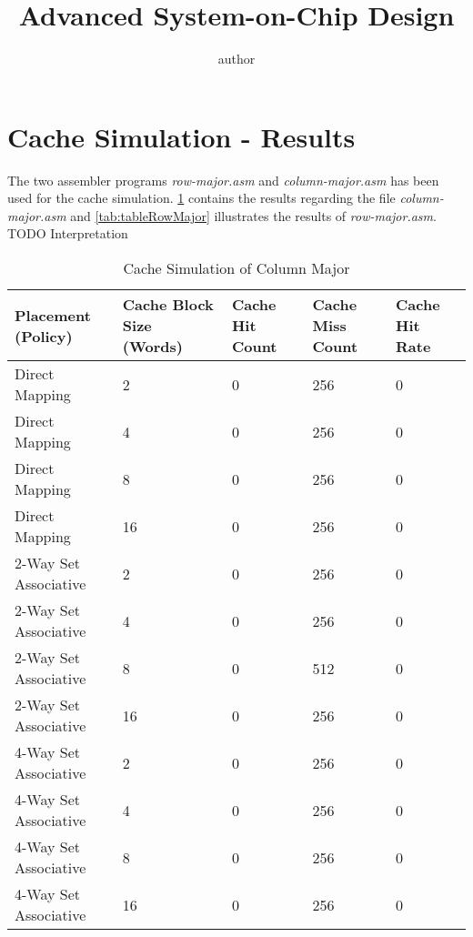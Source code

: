 \documentclass[11pt,a4paper]{article}
\title{Advanced System-on-Chip Design}
\author{author}
\begin{document}


\tableofcontents
\newpage

\section{Cache Simulation - Results}
The two assembler programs \textit{row-major.asm} and \textit{column-major.asm} has been used for the cache simulation. \ref{tab:tableColumnMajor} contains the results regarding the file \textit{column-major.asm} and  \ref{tab:tableRowMajor} illustrates the results of \textit{row-major.asm}.\\
TODO Interpretation



\begin{table}
\centering
\caption{Cache Simulation of Column Major}
\label{tab:tableColumnMajor}
\begin{tabular}{lllll}
\hline %
Placement (Policy) & Cache Block Size (Words) & Cache Hit Count & Cache Miss Count & Cache Hit Rate \\
\hline %
Direct Mapping & 2 & 0 & 256 & 0  \\
Direct Mapping & 4 & 0 & 256 & 0  \\
Direct Mapping & 8 & 0 & 256 & 0  \\
Direct Mapping & 16 & 0 & 256 & 0  \\
2-Way Set Associative & 2 & 0 & 256 & 0 \\
2-Way Set Associative & 4 & 0 & 256 & 0 \\
2-Way Set Associative & 8 & 0 & 512 & 0 \\
2-Way Set Associative & 16 & 0 & 256 & 0 \\
4-Way Set Associative & 2 & 0 & 256 & 0 \\
4-Way Set Associative & 4 & 0 & 256 & 0 \\
4-Way Set Associative & 8 & 0 & 256 & 0 \\
4-Way Set Associative & 16 & 0 & 256 & 0 \\
\hline %
\end{tabular} 
\end{table}
\end{document}
